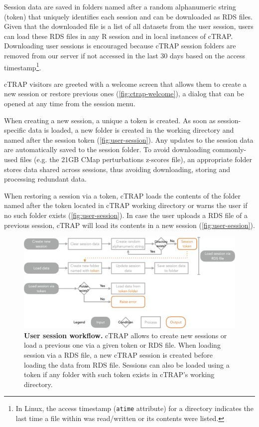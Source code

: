 Session data are saved in folders named after a random alphanumeric string (token) that uniquely identifies each session and can be downloaded as RDS files. Given that the downloaded file is a list of all datasets from the user session, users can load these RDS files in any R session and in local instances of cTRAP. Downloading user sessions is encouraged because cTRAP session folders are removed from our server if not accessed in the last 30 days based on the access timestamp\footnote{In Linux, the access timestamp (\texttt{atime} attribute) for a directory indicates the last time a file within was read/written or its contents were listed.}.

cTRAP visitors are greeted with a welcome screen that allows them to create a new session or restore previous ones (\autoref{fig:ctrap-welcome}), a dialog that can be opened at any time from the session menu.

When creating a new session, a unique a token is created. As soon as session-specific data is loaded, a new folder is created in the working directory and named after the session token (\autoref{fig:user-session}). Any updates to the session data are automatically saved to the session folder. To avoid downloading commonly-used files (e.g. the 21GB CMap perturbations z-scores file), an appropriate folder stores data shared across sessions, thus avoiding downloading, storing and processing redundant data.

When restoring a session via a token, cTRAP loads the contents of the folder named after the token located in cTRAP working directory or warns the user if no such folder exists (\autoref{fig:user-session}). In case the user uploads a RDS file of a previous session, cTRAP will load its contents in a new session (\autoref{fig:user-session}).

\begin{figure}[!ht]
  \includegraphics[width=\textwidth]{images/ctrap/user-session}
  \centering
  \caption[User session workflow]{\textbf{User session workflow.} cTRAP allows to create new sessions or load a previous one via a given token or RDS file. When loading session via a RDS file, a new cTRAP session is created before loading the data from RDS file. Sessions can also be loaded using a token if any folder with such token exists in cTRAP's working directory.}
  \label{fig:user-session}
\end{figure}

